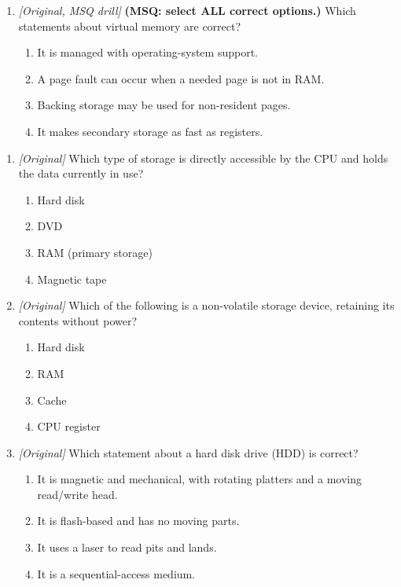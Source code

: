 \begin{enumerate}[label=\textbf{Q\arabic*.}, leftmargin=*]
\item \textit{[Original, MSQ drill]} \textbf{(MSQ: select ALL correct options.)} Which statements about virtual memory are correct?
  \begin{enumerate}[label=\Alph*.]
\item It is managed with operating-system support.
   \item A page fault can occur when a needed page is not in RAM.
   \item Backing storage may be used for non-resident pages.
   \item It makes secondary storage as fast as registers.
  \end{enumerate}

\end{enumerate}
\begin{enumerate}[label=\textbf{Q\arabic*.}, leftmargin=*]
\item \textit{[Original]} Which type of storage is directly accessible by the
  CPU and holds the data currently in use?
  \begin{enumerate}[label=\Alph*.]
    \item Hard disk
    \item DVD
    \item RAM (primary storage)
    \item Magnetic tape
  \end{enumerate}
\item \textit{[Original]} Which of the following is a non-volatile storage
  device, retaining its contents without power?
  \begin{enumerate}[label=\Alph*.]
    \item Hard disk
    \item RAM
    \item Cache
    \item CPU register
  \end{enumerate}
\item \textit{[Original]} Which statement about a hard disk drive (HDD) is
  correct?
  \begin{enumerate}[label=\Alph*.]
    \item It is magnetic and mechanical, with rotating platters and a moving
      read/write head.
    \item It is flash-based and has no moving parts.
    \item It uses a laser to read pits and lands.
    \item It is a sequential-access medium.

\end{enumerate}
\end{enumerate}
